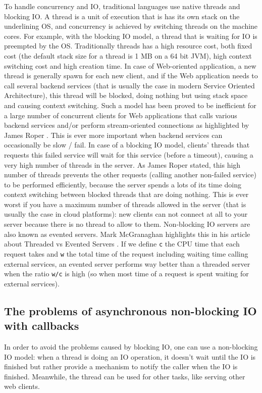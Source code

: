 To handle concurrency and IO, traditional languages use native threads and blocking IO. A thread is a unit of execution that is has its own stack
on the underlining OS, and concurrency is achieved by switching threads on the machine cores. For example, with the blocking IO model,
a thread that is waiting for IO is preempted by the OS. Traditionally threads has a high resource cost, both fixed cost (the default stack size for a thread is 
1 MB on a 64 bit JVM), high context switching cost and high creation time. In case of Web-oriented application, a new thread is generally spawn for each new client,
and if the Web application needs to call several backend services (that is usually the case in modern Service Oriented Architecture), 
this thread will be blocked, doing nothing but using stack space and causing context switching.
Such a model has been proved to be inefficient for a large number of concurrent clients for Web applications that calls various backend services
and/or perform stream-oriented connections as highlighted by James Roper . This is ever more
important when backend services can occasionally be slow / fail. In case of a blocking IO model, clients' threads that requests
this failed service will wait for this service (before a timeout), causing a very high number of threads in the server. As James Roper
stated, this high number of threads prevents the other requests (calling another non-failed service) to be performed efficiently,
because the server spends a lots of its time doing context switching between blocked threads that are doing nothing. This is ever worst if
you have a maximum number of threads allowed in the server (that is usually the case in cloud platforms): new clients can not connect at all
to your server because there is no thread to allow to them. Non-blocking IO servers are also known as evented servers.
Mark McGranaghan highlights this in his article about Threaded vs Evented Servers . If we define \verb|c| the CPU time
that each request takes and \verb|w| the total time of the request including waiting time calling external services, an evented server
performs way better than a threaded server when the ratio \verb|w/c| is high (so when most time of a request is spent waiting for
external services).

\subsection{The problems of asynchronous non-blocking IO with callbacks}
In order to avoid the problems caused by blocking IO, one can use a non-blocking IO model: when a thread is doing an IO operation, it doesn't wait
until the IO is finished but rather provide a mechanism to notify the caller when the IO is finished. Meanwhile, the thread can be used for other tasks, like
serving other web clients. 

